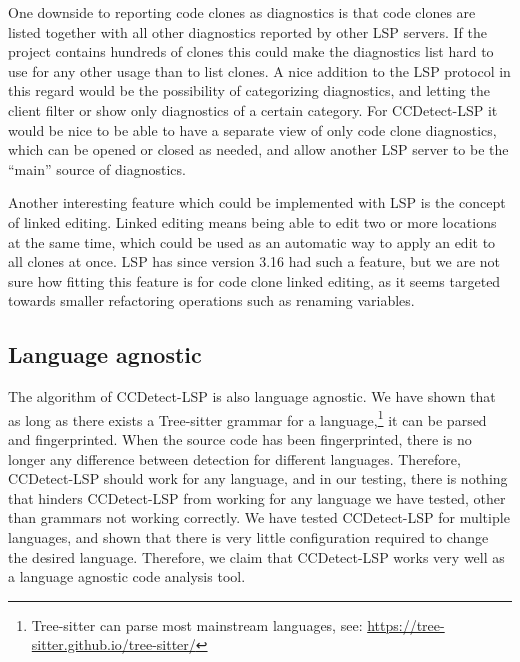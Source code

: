 One downside to reporting code clones as diagnostics is that code clones are listed
together with all other diagnostics reported by other LSP servers. If the project contains
hundreds of clones this could make the diagnostics list hard to use for any other usage
than to list clones. A nice addition to the LSP protocol in this regard would be the
possibility of categorizing diagnostics, and letting the client filter or show only
diagnostics of a certain category. For CCDetect-LSP it would be nice to be able to have a
separate view of only code clone diagnostics, which can be opened or closed as needed, and
allow another LSP server to be the ``main'' source of diagnostics.

Another interesting feature which could be implemented with LSP is the concept of linked
editing. Linked editing means being able to edit two or more locations at the same time,
which could be used as an automatic way to apply an edit to all clones at once. LSP has
since version 3.16 had such a feature, but we are not sure how fitting this feature is for
code clone linked editing, as it seems targeted towards smaller refactoring operations
such as renaming variables.

\subsection*{Language agnostic}

The algorithm of CCDetect-LSP is also language agnostic. We have shown that as long as
there exists a Tree-sitter grammar for a language,\footnote{Tree-sitter can parse most
mainstream languages, see: \url{https://tree-sitter.github.io/tree-sitter/}} it can be
parsed and fingerprinted. When the source code has been fingerprinted, there is no longer
any difference between detection for different languages. Therefore, CCDetect-LSP should
work for any language, and in our testing, there is nothing that hinders CCDetect-LSP from
working for any language we have tested, other than grammars not working correctly. We
have tested CCDetect-LSP for multiple languages, and shown that there is very little
configuration required to change the desired language. Therefore, we claim that
CCDetect-LSP works very well as a language agnostic code analysis tool.

